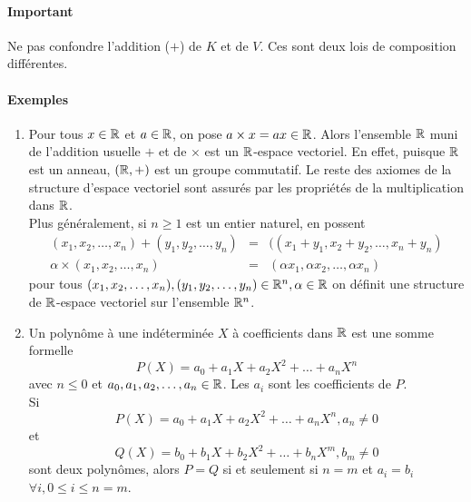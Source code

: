\paragraph{Important} Ne pas confondre l'addition ($+$) de $K$ et de $V$. Ces sont deux lois de composition différentes.

\paragraph{Exemples}
\begin{enumerate}
  \item Pour tous $x \in \mathbb{R}$ et $a\in \mathbb{R}$, on pose $a \times x = a x \in \mathbb{R}$. Alors l'ensemble $\mathbb{R}$ muni de l'addition usuelle $+$ et de $\times$ est un $\mathbb{R}$-espace vectoriel. En effet, puisque $\mathbb{R}$ est un anneau, $(\mathbb{R}, +)$ est un groupe commutatif. Le reste des axiomes de la structure d'espace vectoriel sont assurés par les propriétés de la multiplication dans $\mathbb{R}$. \\
    Plus généralement, si $n \geq 1$ est un entier naturel, en possent
    \begin{eqnarray*}
      (x_1, x_2, \ldots, x_n) + (y_1, y_2, \ldots, y_n) &=& ((x_1+y_1, x_2+y_2, \ldots, x_n+y_n) \\
      \alpha \times (x_1, x_2, \ldots, x_n) &=& (\alpha x_1, \alpha x_2, \ldots, \alpha x_n)
    \end{eqnarray*}
    pour tous $(x_1, x_2, \ldots, x_n), (y_1, y_2, \ldots, y_n) \in \mathbb{R}^n, \alpha \in \mathbb{R}$ on définit une structure de $\mathbb{R}$-espace vectoriel sur l'ensemble $\mathbb{R}^n$.
    
  \item Un polynôme à une indéterminée $X$ à coefficients dans $\mathbb{R}$ est une somme formelle 
    $$P(X) = a_0 + a_1 X + a_2 X^2 + \ldots + a_n X^{n}$$ 
    avec $n \leq 0$ et $a_0, a_1, a_2, \ldots, a_n \in \mathbb{R}$. Les $a_i$ sont les coefficients de $P$. \\
    Si 
    $$P(X) = a_0 + a_1 X + a_2 X^2 + \ldots + a_n X^{n}, a_n \neq 0$$ 
    et 
    $$Q(X) = b_0 + b_1 X + b_2 X^2 + \ldots + b_n X^{m}, b_m \neq 0$$ 
    sont deux polynômes, alors $P=Q$ si et seulement si $n=m$ et $a_i = b_i$  $\forall i, 0 \leq i \leq n = m$. \\
    

\end{enumerate}

